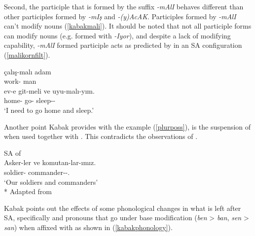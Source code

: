 Second, the participle that is formed by the suffix \textit{-mAlI} behaves different than other participles formed by \textit{-mIş} and \textit{-(y)AcAK}. Participles formed by \textit{-mAlI} can't modify nouns (\ref{kabakmali}). It should be noted that not all participle forms can modify nouns (e.g. formed with \textit{-Iyor}), and despite a lack of modifying capability, \textit{-mAlI} formed participle acts as predicted by \cite{kornfilt1996some} in an SA configuration (\ref{malikornfilt}).

\begin{exe}
\ex \begin{xlist}
    \ex \label{kabakmali}
    \gll *çalış-malı adam \\ work-{\Nec} man \\
    
    \ex \label{malikornfilt} 
    \gll ev-e git-meli ve uyu-malı-yım. \\ 
    home-{\Dat} go-{\Nec} {\And} sleep-{\Nec}-{\Fsg} \\
    \glt `I need to go home and sleep.'
\end{xlist}
\end{exe}

Another point Kabak provides with the example (\ref{plurposs}), is the suspension of {\Poss} when used together with {\Pl}. This contradicts the observations of \cite{orgun1995flat}.

\begin{exe}
    \ex \label{plurposs} SA of {\Poss} \\ 
    \gll Asker-ler ve komutan-lar-ımız. \\ 
    soldier-{\Pl} {\And} commander-{\Pl}-{\Fpl}.{\Poss} \\
    \glt `Our soldiers and commanders'\\*
    \hfill Adapted from \cite{kabak2007turkish}
\end{exe}

Kabak points out the effects of some phonological changes in what is left after SA, specifically {\Fsg} and {\Ssg} pronouns that go under base modification (\textit{ben} {\textgreater} \textit{ban}, \textit{sen} {\textgreater} \textit{san}) when affixed with {\Dat} as shown in (\ref{kabakphonology}).

